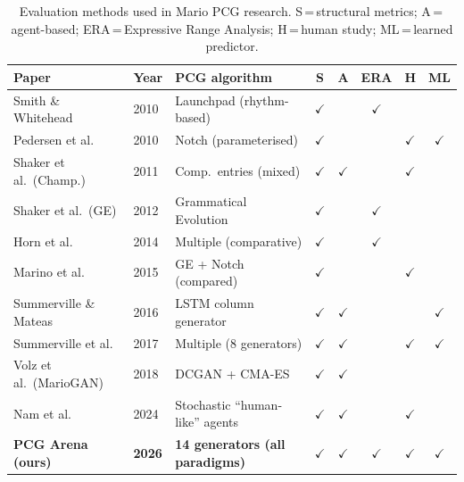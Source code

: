 \documentclass[shortabstract, mgr, english]{iithesis}
\begin{document}
\begin{table}[H]
\centering
\small
\begin{tabular}{lllccccc}
\toprule
\textbf{Paper} & \textbf{Year} & \textbf{PCG algorithm} & \textbf{S} & \textbf{A} & \textbf{ERA} & \textbf{H} & \textbf{ML} \\
\midrule
Smith \& Whitehead          & 2010 & Launchpad (rhythm-based) & $\checkmark$ &              & $\checkmark$ &              &              \\
Pedersen et al.             & 2010 & Notch (parameterised)   & $\checkmark$ &              &              & $\checkmark$ & $\checkmark$ \\
Shaker et al.\ (Champ.)     & 2011 & Comp.\ entries (mixed)  & $\checkmark$ & $\checkmark$ &              & $\checkmark$ &              \\
Shaker et al.\ (GE)         & 2012 & Grammatical Evolution   & $\checkmark$ &              & $\checkmark$ &              &              \\
Horn et al.                 & 2014 & Multiple (comparative)  & $\checkmark$ &              & $\checkmark$ &              &              \\
Marino et al.               & 2015 & GE + Notch (compared)   & $\checkmark$ &              &              & $\checkmark$ &              \\
Summerville \& Mateas       & 2016 & LSTM column generator   & $\checkmark$ & $\checkmark$ &              &              & $\checkmark$ \\
Summerville et al.          & 2017 & Multiple (8 generators) & $\checkmark$ & $\checkmark$ &              & $\checkmark$ & $\checkmark$ \\
Volz et al.\ (MarioGAN)     & 2018 & DCGAN + CMA-ES          & $\checkmark$ & $\checkmark$ &              &              &              \\
Nam et al.                  & 2024 & Stochastic ``human-like'' agents & $\checkmark$ & $\checkmark$ &              & $\checkmark$ &              \\
\midrule
\textbf{PCG Arena (ours)}   & \textbf{2026} & \textbf{14 generators (all paradigms)} & $\checkmark$ & $\checkmark$ & $\checkmark$ & $\checkmark$ & $\checkmark$ \\
\bottomrule
\end{tabular}
\caption{Evaluation methods used in Mario PCG research.
  S\,=\,structural metrics;
  A\,=\,agent-based;
  ERA\,=\,Expressive Range Analysis;
  H\,=\,human study;
  ML\,=\,learned predictor.}
\label{tab:eval-comparison}
\end{table}
\end{document}
